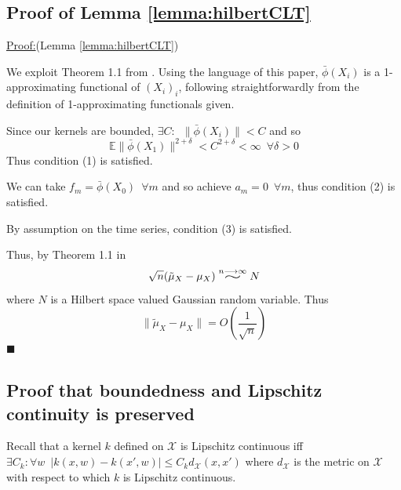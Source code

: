 \documentclass[]{article}
\newenvironment{claimproof}[1]{\par\noindent\underline{Proof:}\space#1}{\hfill $\blacksquare$}
\newcommand{\widesim}[2][1.5]{
  \mathrel{\overset{#2}{\scalebox{#1}[1]{$\sim$}}}}
\begin{document}
\subsection{Proof of Lemma \ref{lemma:hilbertCLT}}\label{supp:lemma-clt}

\begin{claimproof}(Lemma \ref{lemma:hilbertCLT})

We exploit Theorem 1.1 from \cite{dehling2015bootstrap}. Using the language of this paper, $\bar{\phi}(X_i)$ is a 1-approximating functional of $(X_i)_i$, following straightforwardly from the definition of 1-approximating functionals given. 

Since our kernels are bounded, $\exists C: \enspace \|\bar{\phi}(X_i)\| < C $ and so \[\mathbb{E}\|\bar{\phi}(X_1)\|^{2+\delta} <C^{2+\delta}< \infty \enspace \forall \delta>0\]
Thus condition (1) is satisfied.

We can take $f_m = \bar{\phi}(X_0)\enspace \forall m$ and so achieve $a_m= 0 \enspace \forall m$, thus condition (2) is satisfied.

By assumption on the time series, condition (3) is satisfied.

Thus, by Theorem 1.1 in \cite{dehling2015bootstrap}
\[\sqrt{n} (\tilde{\mu}_{X} - \mu_{X}) \widesim[2]{n\longrightarrow\infty} N\]
where $N$ is a Hilbert space valued Gaussian random variable. Thus 
\[\|\tilde{\mu}_{X} - \mu_{X}\| = O(\frac{1}{\sqrt{n}})\]
\end{claimproof}

\subsection{Proof that boundedness and Lipschitz continuity is preserved}\label{supp:bounded-and-lipschitz}
Recall that a kernel $k$ defined on $\mathcal{X}$ is Lipschitz continuous iff $\exists C_k : \forall w \enspace |k(x,w) - k(x',w)| \leq C_k d_\mathcal{X}(x,x')$ where $d_\mathcal{X}$ is the metric on $\mathcal{X}$ with respect to which $k$ is Lipschitz continuous.
\end{document}
